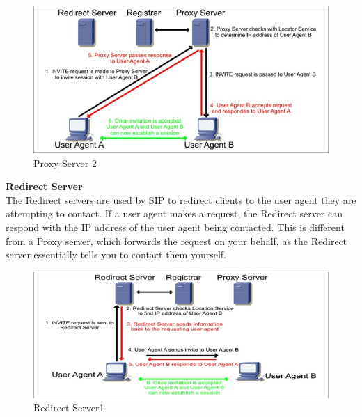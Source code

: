 \documentclass[a4paper]{article}
\begin{document}
\begin{center}
\begin{figure}[H]
\includegraphics[width=1\linewidth]{./pictures/proxy2.JPG}
\caption{\label{fig:Proxy Server2} Proxy Server 2}
\end{figure}
\end{center}

\textbf{Redirect Server\\}
The Redirect servers are used by SIP to redirect clients to the user agent they are attempting to contact. If a user agent makes a request, the Redirect server can respond with the IP address of the user agent being contacted. This is different from a Proxy server, which forwards the request on your behalf, as the Redirect server essentially tells you to contact them yourself.

\begin{center}
\begin{figure}[H]
\includegraphics[width=1\linewidth]{./pictures/redirect.JPG}
\caption{\label{fig:Redirect Server} Redirect Server1}
\end{figure}
\end{center}
\end{document}
